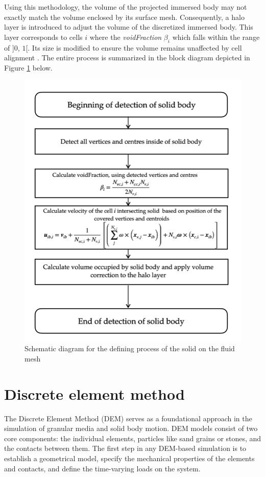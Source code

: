 Using this methodology, the volume of the projected immersed body may not exactly match the volume enclosed by its surface mesh. Consequently, a halo layer is introduced to adjust the volume of the discretized immersed body. This layer corresponds to cells $i$ where the \textit{voidFraction} $\beta_i$ which falls within the range of ]$0$, $1$[. Its size is modified to ensure the volume remains unaffected by cell alignment \cite{blais2016semi}. The entire process is summarized in the block diagram depicted in Figure \ref{fig:diag} below.
\begin{figure}[H]
    \centering
    \includegraphics[width=12cm]{Images/chap3/diag.png}
    \caption{Schematic diagram for the defining process of the solid on the fluid mesh}
    \label{fig:diag}
\end{figure}
\section{Discrete element method}
The Discrete Element Method (DEM) serves as a foundational approach in the simulation of granular media and solid body motion. DEM models consist of two core components: the individual elements, particles like sand grains or stones, and the contacts between them. The first step in any DEM-based simulation is to establish a geometrical model, specify the mechanical properties of the elements and contacts, and define the time-varying loads on the system.

